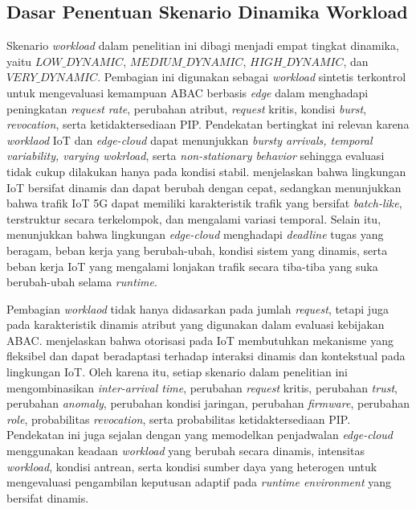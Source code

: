 \subsection{Dasar Penentuan Skenario Dinamika Workload}

Skenario \textit{workload} dalam penelitian ini dibagi menjadi empat tingkat dinamika, yaitu $LOW\_DYNAMIC$, $MEDIUM\_DYNAMIC$, $HIGH\_DYNAMIC$, dan $VERY\_DYNAMIC$. Pembagian ini digunakan sebagai \textit{workload} sintetis terkontrol untuk mengevaluasi kemampuan ABAC berbasis \textit{edge} dalam menghadapi peningkatan \textit{request rate}, perubahan atribut, \textit{request} kritis, kondisi \textit{burst}, \textit{revocation}, serta ketidaktersediaan PIP. Pendekatan bertingkat ini relevan karena \textit{worklaod} IoT dan \textit{edge-cloud} dapat menunjukkan \textit{bursty arrivals, temporal variability, varying wokrload}, serta \textit{non-stationary behavior} sehingga evaluasi tidak cukup dilakukan hanya pada kondisi stabil. \textcite{latifi_optimizing_2025} menjelaskan bahwa lingkungan IoT bersifat dinamis dan dapat berubah dengan cepat, sedangkan \textcite{kovtun_stochastic_2025} menunjukkan bahwa trafik IoT 5G dapat memiliki karakteristik trafik yang bersifat \textit{batch-like}, terstruktur secara terkelompok, dan mengalami variasi temporal. Selain itu, \textcite{raju_intellischeduler_2026} menunjukkan bahwa lingkungan \textit{edge-cloud} menghadapi \textit{deadline} tugas yang beragam, beban kerja yang berubah-ubah, kondisi sistem yang dinamis, serta beban kerja IoT yang mengalami lonjakan trafik secara tiba-tiba yang suka berubah-ubah selama \textit{runtime}.

Pembagian \textit{worklaod} tidak hanya didasarkan pada jumlah \textit{request}, tetapi juga pada karakteristik dinamis atribut yang digunakan dalam evaluasi kebijakan ABAC. \textcite{diaz_authorization_2025} menjelaskan bahwa otorisasi pada IoT membutuhkan mekanisme yang fleksibel dan dapat beradaptasi terhadap interaksi dinamis dan kontekstual pada lingkungan IoT. Oleh karena itu, setiap skenario dalam penelitian ini mengombinasikan \textit{inter-arrival time}, perubahan \textit{request} kritis, perubahan \textit{trust}, perubahan \textit{anomaly}, perubahan kondisi jaringan, perubahan \textit{firmware}, perubahan \textit{role}, probabilitas \textit{revocation}, serta probabilitas ketidaktersediaan PIP. Pendekatan ini juga sejalan dengan \textcite{raju_intellischeduler_2026} yang memodelkan penjadwalan \textit{edge-cloud} menggunakan keadaan \textit{workload} yang berubah secara dinamis, intensitas \textit{workload}, kondisi antrean, serta kondisi sumber daya yang heterogen untuk mengevaluasi pengambilan keputusan adaptif pada \textit{runtime environment} yang bersifat dinamis. 

